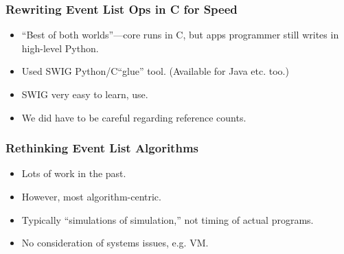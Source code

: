 \documentclass{beamer}
\begin{document}
\begin{frame}
\frametitle{Rewriting Event List Ops in C for Speed}

\pause

\begin{itemize}

\item ``Best of both worlds''---core runs in C, but apps programmer
still writes in high-level Python.

\pause

\item Used SWIG Python/C``glue'' tool.  (Available for Java etc.  too.)

\pause

\item SWIG very easy to learn, use.

\pause

\item We did have to be careful regarding reference counts.

\end{itemize}

\end{frame}

\begin{frame}
\frametitle{Rethinking Event List Algorithms}

\pause

\begin{itemize}

\item Lots of work in the past.

\pause

\item However, most algorithm-centric.

\pause

\item Typically ``simulations of simulation,'' not timing of actual
programs.

\pause

\item No consideration of systems issues, e.g. VM.

\end{itemize}

\end{frame}
\end{document}

